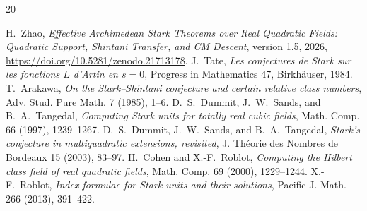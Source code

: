 \documentclass[11pt]{article}
\begin{document}
\begin{thebibliography}{20}
\raggedright
\footnotesize
{} H.~Zhao, \emph{Effective Archimedean Stark
Theorems over Real Quadratic Fields: Quadratic Support, Shintani
Transfer, and CM Descent}, version 1.5, 2026,
\url{https://doi.org/10.5281/zenodo.21713178}.
 J.~Tate, \emph{Les conjectures de Stark sur les
fonctions $L$ d'Artin en $s=0$}, Progress in Mathematics 47,
Birkh\"auser, 1984.
 T.~Arakawa, \emph{On the Stark--Shintani
conjecture and certain relative class numbers}, Adv. Stud. Pure Math.
7 (1985), 1--6.
 D.~S.~Dummit, J.~W.~Sands, and B.~A.~Tangedal,
\emph{Computing Stark units for totally real cubic fields}, Math.
Comp. 66 (1997), 1239--1267.
 D.~S.~Dummit, J.~W.~Sands, and B.~A.~Tangedal,
\emph{Stark's conjecture in multiquadratic extensions, revisited}, J.
Th\'eorie des Nombres de Bordeaux 15 (2003), 83--97.
 H.~Cohen and X.-F.~Roblot, \emph{Computing
the Hilbert class field of real quadratic fields}, Math. Comp. 69
(2000), 1229--1244.
 X.-F.~Roblot, \emph{Index formulae for Stark
units and their solutions}, Pacific J. Math. 266 (2013), 391--422.
\end{thebibliography}
\end{document}
